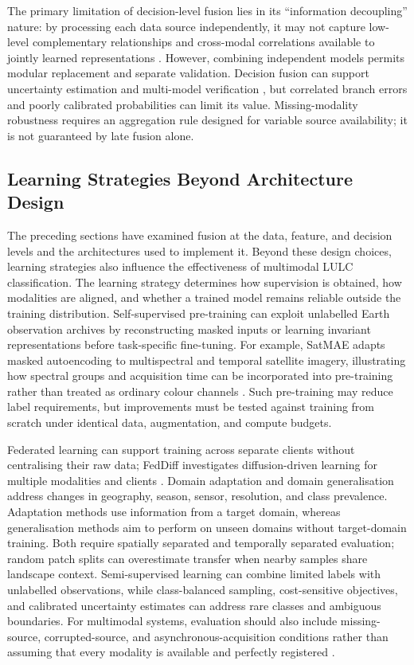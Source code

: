 \documentclass[]{interact}
\theoremstyle{plain}%
\theoremstyle{definition}
\theoremstyle{remark}
\begin{document}
The primary limitation of decision-level fusion lies in its ``information decoupling'' nature: by processing each data source independently, it may not capture low-level complementary relationships and cross-modal correlations available to jointly learned representations \citep{6}. However, combining independent models permits modular replacement and separate validation. Decision fusion can support uncertainty estimation and multi-model verification \citep{55,kampffmeyer2018urban}, but correlated branch errors and poorly calibrated probabilities can limit its value. Missing-modality robustness requires an aggregation rule designed for variable source availability; it is not guaranteed by late fusion alone.


\subsection{Learning Strategies Beyond Architecture Design}

The preceding sections have examined fusion at the data, feature, and decision levels and the architectures used to implement it. Beyond these design choices, learning strategies also influence the effectiveness of multimodal LULC classification. The learning strategy determines how supervision is obtained, how modalities are aligned, and whether a trained model remains reliable outside the training distribution. Self-supervised pre-training can exploit unlabelled Earth observation archives by reconstructing masked inputs or learning invariant representations before task-specific fine-tuning. For example, SatMAE adapts masked autoencoding to multispectral and temporal satellite imagery, illustrating how spectral groups and acquisition time can be incorporated into pre-training rather than treated as ordinary colour channels \citep{cong2022satmae}. Such pre-training may reduce label requirements, but improvements must be tested against training from scratch under identical data, augmentation, and compute budgets.

Federated learning can support training across separate clients without centralising their raw data; FedDiff investigates diffusion-driven learning for multiple modalities and clients \citep{li2024feddiff}. Domain adaptation and domain generalisation address changes in geography, season, sensor, resolution, and class prevalence. Adaptation methods use information from a target domain, whereas generalisation methods aim to perform on unseen domains without target-domain training. Both require spatially separated and temporally separated evaluation; random patch splits can overestimate transfer when nearby samples share landscape context. Semi-supervised learning can combine limited labels with unlabelled observations, while class-balanced sampling, cost-sensitive objectives, and calibrated uncertainty estimates can address rare classes and ambiguous boundaries. For multimodal systems, evaluation should also include missing-source, corrupted-source, and asynchronous-acquisition conditions rather than assuming that every modality is available and perfectly registered \citep{kampffmeyer2018urban}.
\end{document}

